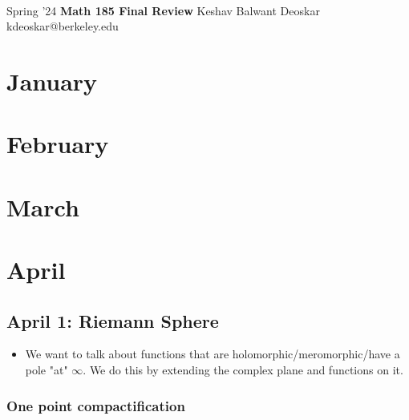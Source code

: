 \documentclass[11pt]{article}
\begin{document}
\thispagestyle{empty}
\bigskip \
\vspace{0.1cm}

\begin{center}
{\fontsize{22}{22} \selectfont Spring '24}
\vskip 16pt
{\fontsize{36}{36} \selectfont \bf \sffamily Math 185 Final Review}
\vskip 24pt
{\fontsize{18}{18} \selectfont \rmfamily Keshav Balwant Deoskar} 
\vskip 6pt
{\fontsize{14}{14} \selectfont \ttfamily kdeoskar@berkeley.edu} 
\vskip 24pt
\end{center}


\newpage
\microtoc
\newpage

\section{January}

\section{February}

\section{March}

\section{April}

\subsection{April 1: Riemann Sphere}
\vskip 0.5cm
\begin{itemize}
    \item We want to talk about functions that are holomorphic/meromorphic/have a pole "at" $\infty$. We do this by extending the complex plane and functions on it.
\end{itemize}

\vskip 0.5cm
\subsubsection{One point compactification}
\end{document}
